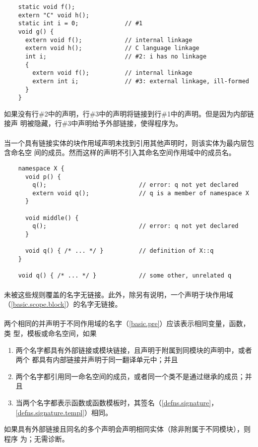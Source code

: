 \begin{example}
  \begin{lstlisting}
    static void f();
    extern "C" void h();
    static int i = 0;             // #1
    void g() {
      extern void f();            // internal linkage
      extern void h();            // C language linkage
      int i;                      // #2: i has no linkage
      {
        extern void f();          // internal linkage
        extern int i;             // #3: external linkage, ill-formed
      }
    }
  \end{lstlisting}
  如果没有行\#2中的声明，行\#3中的声明将链接到行\#1中的声明。但是因为内部链接声
  明被隐藏，行\#3中声明给予外部链接，使得程序为\illform{}。
\end{example}

\paragraph{} %
当一个具有链接实体的块作用域声明未找到引用其他声明时，则该实体为最内层包含命名空
间的成员。然而这样的声明不引入其命名空间作用域中的成员名。

\begin{example}
  \begin{lstlisting}
    namespace X {
      void p() {
        q();                          // error: q not yet declared
        extern void q();              // q is a member of namespace X
      }

      void middle() {
        q();                          // error: q not yet declared
      }

      void q() { /* ... */ }          // definition of X::q
    }

    void q() { /* ... */ }            // some other, unrelated q
  \end{lstlisting}
\end{example}

\paragraph{} %
未被这些规则覆盖的名字无链接。此外，除另有说明，一个声明于块作用域
（\ref{basic.scope.block}）的名字无链接。

\paragraph{} %
两个相同的并声明于不同作用域的名字（\ref{basic.pre}）应该表示相同变量，函数，类
型，模板或命名空间，如果
\begin{enumerate}
  \item 两个名字都具有外部链接或模块链接，且声明于附属到同模块的声明中，或者两个
        都具有内部链接并声明于同一翻译单元中；并且
  \item 两个名字都引用同一命名空间的成员，或者同一个类不是通过继承的成员；并且
  \item 当两个名字都表示函数或函数模板时，其签名（\ref{defns.signature}，
        \ref{defns.signature.templ}）相同。
\end{enumerate}
如果具有外部链接且同名的多个声明会声明相同实体（除非附属于不同模块），则程序
为\illform{}；无需诊断。

